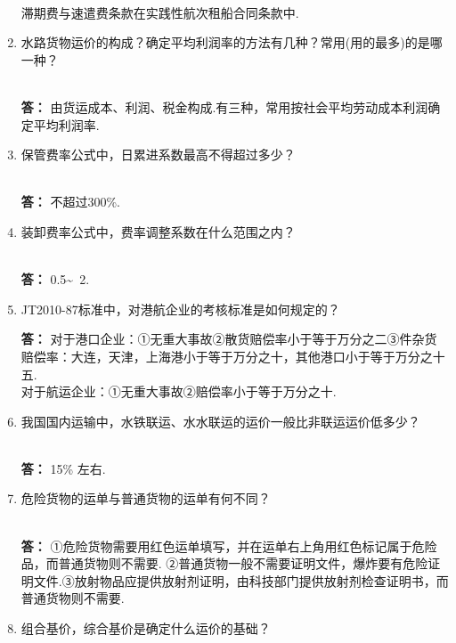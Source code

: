 \documentclass[UTF8]{ctexart}
\begin{document}
\begin{enumerate}[1]
\\ 滞期费与速遣费条款在实践性航次租船合同条款中.
 \item \begin{CJK}{UTF8}{you} 水路货物运价的构成？确定平均利润率的方法有几种？常用(用的最多)的是哪一种？
\end{CJK}
\\ \textbf{答：} 由货运成本、利润、税金构成.有三种，常用按社会平均劳动成本利润确定平均利润率.
 \item \begin{CJK}{UTF8}{you} 保管费率公式中，日累进系数最高不得超过多少？
\end{CJK}\\
 \textbf{答：} 不超过300\%.
\item \begin{CJK}{UTF8}{you} 装卸费率公式中，费率调整系数在什么范围之内？
\end{CJK}\\
 \textbf{答：} 0.5\~~2.
\item \begin{CJK}{UTF8}{you} JT2010-87标准中，对港航企业的考核标准是如何规定的？

\end{CJK}
 \textbf{答：} 对于港口企业：①无重大事故②散货赔偿率小于等于万分之二③件杂货赔偿率：大连，天津，上海港小于等于万分之十，其他港口小于等于万分之十五.
\\ 对于航运企业：①无重大事故②赔偿率小于等于万分之十.
\item \begin{CJK}{UTF8}{you} 我国国内运输中，水铁联运、水水联运的运价一般比非联运运价低多少？
\end{CJK}\\
 \textbf{答：} 15\% 左右.
\item \begin{CJK}{UTF8}{you} 危险货物的运单与普通货物的运单有何不同？
\end{CJK}\\
 \textbf{答：} ①危险货物需要用红色运单填写，并在运单右上角用红色标记属于危险品，而普通货物则不需要.
②普通货物一般不需要证明文件，爆炸要有危险证明文件.③放射物品应提供放射剂证明，由科技部门提供放射剂检查证明书，而普通货物则不需要.
\item \begin{CJK}{UTF8}{you} 组合基价，综合基价是确定什么运价的基础？


\end{CJK}
\end{enumerate}
\end{document}
